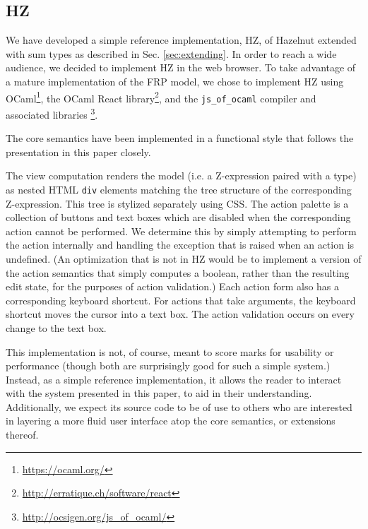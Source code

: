 \subsection{HZ}
We have developed a simple reference implementation, HZ, of Hazelnut extended with sum types as described in Sec. \ref{sec:extending}.  In
order to reach a wide audience, we decided to implement HZ in the web
browser.  To take advantage of a mature implementation of the FRP
model, we chose to implement HZ using
OCaml\footnote{\url{https://ocaml.org/}}, the OCaml React
library\footnote{\url{http://erratique.ch/software/react}}, and the \texttt{js\_of\_ocaml}
compiler and associated libraries
\cite{DBLP:conf/ml/Balat06}\footnote{\url{http://ocsigen.org/js\_of\_ocaml/}}. 

The core semantics have
been implemented in a functional style that follows the presentation in this paper closely.

The view computation renders the model (i.e. a Z-expression paired with a type) as nested HTML \texttt{div} elements matching the tree structure of the corresponding Z-expression. This tree is stylized separately using CSS. The action palette is a collection of buttons and text boxes which
are disabled when the corresponding action cannot be performed. We determine this by simply attempting to perform the
action internally and handling the exception that is raised when an action
is undefined. (An optimization that is not in HZ would be to implement a version of the action semantics that simply computes a boolean, rather than the resulting edit state, for the purposes of action validation.) Each action form also has a corresponding keyboard shortcut. For actions that take arguments, the keyboard shortcut moves the cursor into a text box. The action validation occurs on every change to the text box.

This implementation is not, of course, meant to score marks for
usability or performance (though both are surprisingly good for such a simple system.) Instead, as a simple reference implementation, it allows the reader to interact with the system presented in this paper, to aid in their understanding.  Additionally, we expect its source code to be of use to others who are interested in
layering a more fluid user interface atop the core semantics, or extensions thereof. 
